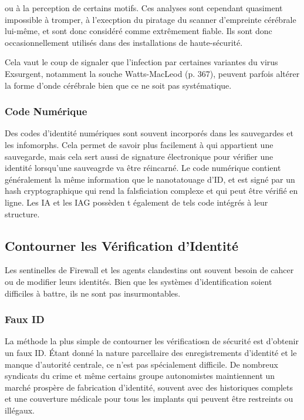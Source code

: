 ou à la perception de certains motifs. Ces analyses sont cependant quasiment impossible à tromper, à l'execption du piratage du scanner d'empreinte cérébrale lui-même, et sont donc considéré comme extrêmement fiable. Ils sont donc occasionnellement utilisés dans des installations de haute-sécurité. 

Cela vaut le coup de signaler que l'infection par certaines variantes du virus Exsurgent, notamment la souche Watts-MacLeod (p. 367), peuvent parfois altérer la forme d'onde cérébrale bien que ce ne soit pas systématique. 

\subsubsection{Code Numérique} 

Des codes d'identité numériques sont souvent incorporés dans les sauvegardes et les infomorphs. Cela permet de savoir plus facilement à qui appartient une sauvegarde, mais cela sert aussi de signature électronique pour vérifier une identité lorsqu'une sauveagrde va être réincarné. Le code numérique contient généralement la même information que le nanotatouage d'ID, et est signé par un hash cryptographique qui rend la falsficiation complexe et qui peut être vérifié en ligne. Les IA et les IAG possèden t également de tels code intégrés à leur structure. 

\subsection{Contourner les Vérification d'Identité} 

Les sentinelles de Firewall et les agents clandestins ont souvent besoin de cahcer ou de modifier leurs identités. Bien que les systèmes d'identification soient difficiles à battre, ils ne sont pas insurmontables. 

\subsubsection{Faux ID} 

La méthode la plus simple de contourner les vérificatiosn de sécurité est d'obtenir un faux ID. Étant donné la nature parcellaire des enregistrements d'identité et le manque d'autorité centrale, ce n'est pas spécialement difficile. De nombreux syndicats du crime et même certains groupe autonomistes maintiennent un marché prospère de fabrication d'identité, souvent avec des historiques complets et une couverture médicale pour tous les implants qui peuvent être restreints ou illégaux. 

